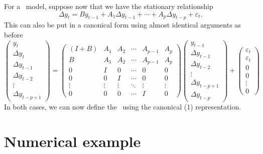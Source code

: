\documentclass[12pt,fleqn]{article}
\newcommand{\vep}{\varepsilon}
\newcommand{\VECM}{\allcaps{VECM}}
\begin{document}
For a \VECM\ model, suppose now that we have the stationary
relationship
\begin{equation*}
  \Delta y_t = B y_{t-1} + A_1 \Delta y_{t-1} + \cdots + A_p \Delta
  y_{t-p} + \vep_t.
\end{equation*}
This can also be put in a canonical form using almost identical
arguments as before
\begin{equation*}
  \begin{pmatrix}
    y_t \\ \Delta y_t \\ \Delta y_{t-1} \\ \Delta y_{t-2} \\ \vdots \\
    \Delta y_{t-p+1}
  \end{pmatrix}
  =
  \begin{pmatrix}
    (I + B) & A_1 & A_2 & \cdots & A_{p-1} & A_p \\
    B & A_1 & A_2 & \cdots & A_{p-1} & A_p \\
    0 & I   & 0   & \cdots & 0 & 0 \\
    0 & 0   & I   & \cdots & 0 & 0 \\
    \vdots & \vdots & \vdots & \ddots & \vdots & \vdots \\
    0 & 0 & 0 & \cdots & I & 0
  \end{pmatrix}
  \begin{pmatrix}
    y_{t-1} \\ \Delta y_{t-1} \\ \Delta y_{t-2} \\ \vdots \\ \Delta y_{t-p+1} \\
    \Delta y_{t-p}
  \end{pmatrix}
  +
  \begin{pmatrix}
    \vep_t \\ \vep_t \\ 0 \\ 0 \\ \vdots \\ 0
  \end{pmatrix}
\end{equation*}
In both cases, we can now define the \IRF\ using the canonical \VAR(1)
representation.

\section{Numerical example}\label{example}
\end{document}
